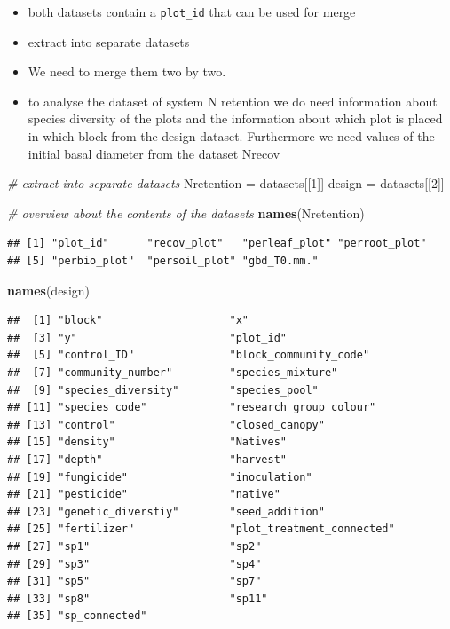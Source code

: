 \documentclass[]{article}
\newenvironment{Shaded}{}{}
\newcommand{\KeywordTok}[1]{\textcolor[rgb]{0.00,0.44,0.13}{\textbf{{#1}}}}
\newcommand{\DecValTok}[1]{\textcolor[rgb]{0.25,0.63,0.44}{{#1}}}
\newcommand{\CommentTok}[1]{\textcolor[rgb]{0.38,0.63,0.69}{\textit{{#1}}}}
\newcommand{\NormalTok}[1]{{#1}}
\begin{document}
\begin{itemize}
\item
  both datasets contain a \texttt{plot\_id} that can be used for merge
\item
  extract into separate datasets
\item
  We need to merge them two by two.
\item
  to analyse the dataset of system N retention we do need information
  about species diversity of the plots and the information about which
  plot is placed in which block from the design dataset. Furthermore we
  need values of the initial basal diameter from the dataset Nrecov
\end{itemize}

\begin{Shaded}
\begin{Highlighting}[]
\CommentTok{# extract into separate datasets}
\NormalTok{Nretention = datasets[[}\DecValTok{1}\NormalTok{]]}
\NormalTok{design = datasets[[}\DecValTok{2}\NormalTok{]]}

\CommentTok{# overview about the contents of the datasets}
\KeywordTok{names}\NormalTok{(Nretention)}
\end{Highlighting}
\end{Shaded}

\begin{verbatim}
## [1] "plot_id"      "recov_plot"   "perleaf_plot" "perroot_plot"
## [5] "perbio_plot"  "persoil_plot" "gbd_T0.mm."
\end{verbatim}

\begin{Shaded}
\begin{Highlighting}[]
\KeywordTok{names}\NormalTok{(design)}
\end{Highlighting}
\end{Shaded}

\begin{verbatim}
##  [1] "block"                    "x"                       
##  [3] "y"                        "plot_id"                 
##  [5] "control_ID"               "block_community_code"    
##  [7] "community_number"         "species_mixture"         
##  [9] "species_diversity"        "species_pool"            
## [11] "species_code"             "research_group_colour"   
## [13] "control"                  "closed_canopy"           
## [15] "density"                  "Natives"                 
## [17] "depth"                    "harvest"                 
## [19] "fungicide"                "inoculation"             
## [21] "pesticide"                "native"                  
## [23] "genetic_diverstiy"        "seed_addition"           
## [25] "fertilizer"               "plot_treatment_connected"
## [27] "sp1"                      "sp2"                     
## [29] "sp3"                      "sp4"                     
## [31] "sp5"                      "sp7"                     
## [33] "sp8"                      "sp11"                    
## [35] "sp_connected"
\end{verbatim}
\end{document}
